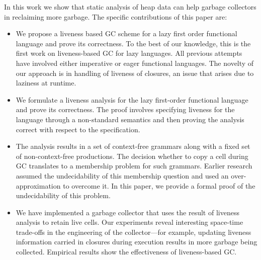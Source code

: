 \documentclass[9pt,preprint,nonatbib]{sigplanconf}
\newcommand{\added}[1]{#1}
\begin{document}
In  this work  we show  that  static analysis  of heap  data can  help
garbage  collectors   in  reclaiming   more  garbage.    The  specific
contributions of this paper are:
\added{
\begin{itemize}
\item We  propose a liveness  based GC scheme  for a lazy  first order
  functional language and  prove its correctness.  To the  best of our
  knowledge,  this is  the first  work on  liveness-based GC  for lazy
  languages.       All      previous      attempts~\cite{shaham01heap,
    ran.shaham-sas03,          shaham02estimating,         asati14lgc,
    karkare06effectiveness} have  involved either imperative  or eager
  functional languages.  The novelty of our approach is in handling of
  liveness  of closures,  an  issue  that arises  due  to laziness  at
  runtime.

\item  We  formulate a  liveness  analysis  for the  lazy  first-order
  functional language  and prove  its correctness. The  proof involves
  specifying  liveness   for  the  language  through   a  non-standard
  semantics and then proving the  analysis correct with respect to the
  specification.

\item The  analysis results  in a set  of context-free  grammars along
  with  a fixed  set  of non-context-free  productions.  The  decision
  whether to copy a cell during  GC translates to a membership problem
  for such  grammars.  Earlier research assumed  the undecidability of
  this membership question and  used an over-approximation to overcome
  it.  In this paper, we provide  a formal proof of the undecidability
  of this problem.

\item We have implemented a garbage collector that uses the result of
  liveness  analysis to  retain  live cells.   Our experiments  reveal
  interesting  space-time   trade-offs  in  the  engineering   of  the
  collector---for  example, updating  liveness information  carried in
  closures during  execution results in more  garbage being collected.
  Empirical results  show the effectiveness of  liveness-based GC.
\end{itemize}
}
\end{document}
